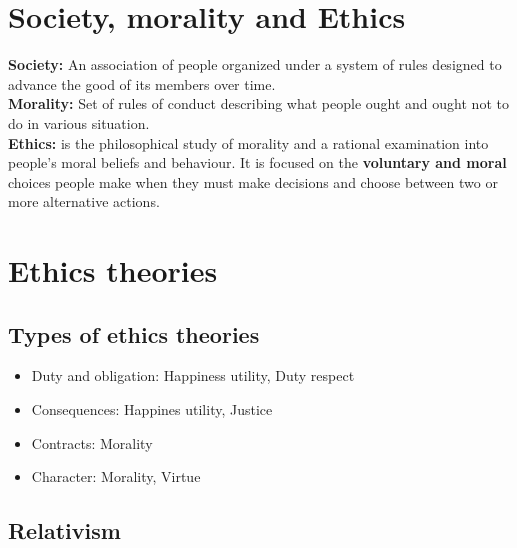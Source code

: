 \documentclass{article}
\begin{document}
\tableofcontents

\newpage

\section{Society, morality and Ethics}
\begin{flushleft}
\textbf{Society:} An association of people organized under a system of rules designed to advance the good of its members over time.\\ \textbf{Morality:} Set of rules of conduct describing what people ought and ought not to do in various situation.\\
\textbf{Ethics:} is the philosophical study of morality and a rational examination into people’s moral beliefs and behaviour. It is focused on the \textbf{voluntary and moral} choices people make when they must make decisions and choose between two or more alternative actions.
\end{flushleft}

\section{Ethics theories}

\subsection{Types of ethics theories}
\begin{itemize}
  \item Duty and obligation: Happiness utility, Duty respect
  \item Consequences: Happines utility, Justice
  \item Contracts: Morality
  \item Character: Morality, Virtue
\end{itemize}

\subsection{Relativism}
\end{document}
